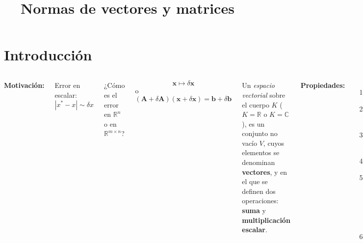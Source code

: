\documentclass[9pt, aspectratio=169]{beamer}
\title{Normas de vectores y matrices}
\subtitle{}
\begin{document}
  \maketitle

  \section{Introducción}

  \begin{frame}
  \begin{columns}[t]
  \cx
  \textbf{Motivación:}

  Error en escalar:
  \[ |x^* - x| \sim \delta x \]

  ¿Cómo es el error en $\mathbb{R}^n$ o en $\mathbb{R}^{m \times n}$?

  \[ \bm{x} \mapsto \delta \bm{x} \]
  o
  \[ (\bm{A} + \delta \bm{A})(\bm{x} + \delta \bm{x}) = \bm{b} + \delta \bm{b} \]
  \pause

  \begin{definition}
  Un \textit{espacio vectorial} sobre el cuerpo $K$ ($K = \mathbb{R}$ o $K = \mathbb{C}$), es un conjunto no vacío $V$, cuyos elementos se denominan \textbf{vectores}, y en el que se definen dos operaciones: \textbf{suma} y \textbf{multiplicación escalar}.
  \end{definition} \pause

  \cx
  \textbf{Propiedades:}
  \begin{enumerate}
      \item La suma es conmutativa y asociativa.
      \item $\exists\; \bm{0} \in V$ (vector cero o nulo) tal que $\bm{v} + \bm{0} = \bm{v}, \; \forall \bm{v} \in V$.
      \item $0 \cdot \bm{v} = \bm{0}, 1 \cdot \bm{v} = \bm{v}$, donde $0$ y $1$ son respectivamente el cero y uno de $K$.
      \item $\forall \bm{v} \in V, \exists -\bm{v} \in V : \bm{v} + (-\bm{v}) = \bm{0}$.
      \item Propiedad distributiva:
          \begin{itemize}
          \item $\forall \alpha \in K, \forall \bm{v}, \bm{w} \in V, \alpha(\bm{v} + \bm{w}) = \alpha \bm{v} + \alpha \bm{w}$.
          \item $\forall \alpha, \beta \in K, \forall \bm{v} \in V, (\alpha + \beta) \bm{v} = \alpha \bm{v} + \beta \bm{v}$.
          \end{itemize}
      \item Propiedad asociativa:
          \begin{itemize}
              \item $\forall \alpha, \beta \in K, \forall \bm{v} \in V, (\alpha \beta)\bm{v} = \alpha (\beta \bm{v})$
          \end{itemize}
  \end{enumerate} \pause


\end{columns}
\end{frame}
\end{document}
